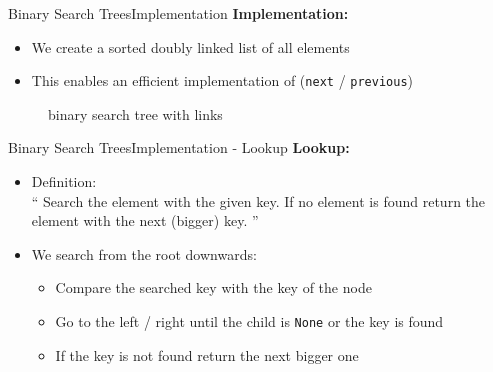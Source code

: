 \begin{frame}{Binary Search Trees}{Implementation}
  \textbf{Implementation:}
  \begin{itemize}
    \item<2->
      We create a sorted doubly linked list of all elements
    \item<3->
      This enables an efficient implementation of
      (\texttt{\color{Mittel-Blau}next} /
      \texttt{\color{Mittel-Blau}previous})
  \end{itemize}
  \begin{figure}
    
    \caption{binary search tree with links}
    \label{fig:binary_search_trees:binary_tree_impl2}
  \end{figure}
\end{frame}


\begin{frame}{Binary Search Trees}{Implementation - Lookup}
  \textbf{Lookup:}
  \begin{itemize}
    \item<2->
      Definition:\\
      \enquote{
        Search the element with the given key.
        If no element is found return the element with the next (bigger) key.
      }
    \item<3->
      We search from the root downwards:
      \begin{itemize}
        \item<4->
          Compare the searched key with the key of the node
        \item<5->
          Go to the left / right until the child is
          \texttt{\color{Mittel-Blau}None} or the key is found
        \item<6->
          If the key is not found return the next bigger one
      \end{itemize}
  \end{itemize}
\end{frame}


